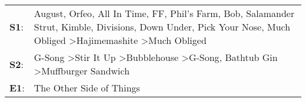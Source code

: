 \begin{supertabular}{p{0.03\textwidth}p{0.92\textwidth}}
 \textbf{S1}:  &  August\textsuperscript{}, \enspace Orfeo\textsuperscript{}, \enspace All In Time\textsuperscript{}, \enspace FF\textsuperscript{}, \enspace Phil's Farm\textsuperscript{}, \enspace Bob\textsuperscript{}, \enspace Salamander Strut\textsuperscript{}, \enspace Kimble\textsuperscript{}, \enspace Divisions\textsuperscript{}, \enspace Down Under\textsuperscript{}, \enspace Pick Your Nose\textsuperscript{}, \enspace Much Obliged\textsuperscript{} \textgreater \enspace Hajimemashite\textsuperscript{} \textgreater \enspace Much Obliged\textsuperscript{}  \enspace  \\
 \textbf{S2}:  &                                                                                                                                                                                                                                                                                     G-Song\textsuperscript{} \textgreater \enspace Stir It Up\textsuperscript{} \textgreater \enspace Bubblehouse\textsuperscript{} \textgreater \enspace G-Song\textsuperscript{}, \enspace Bathtub Gin\textsuperscript{} \textgreater \enspace Muffburger Sandwich\textsuperscript{}  \enspace  \\
 \textbf{E1}:  &                                                                                                                                                                                                                                                                                                                                                                                                                                                                                                                             The Other Side of Things\textsuperscript{}  \enspace  \\
\end{supertabular}
